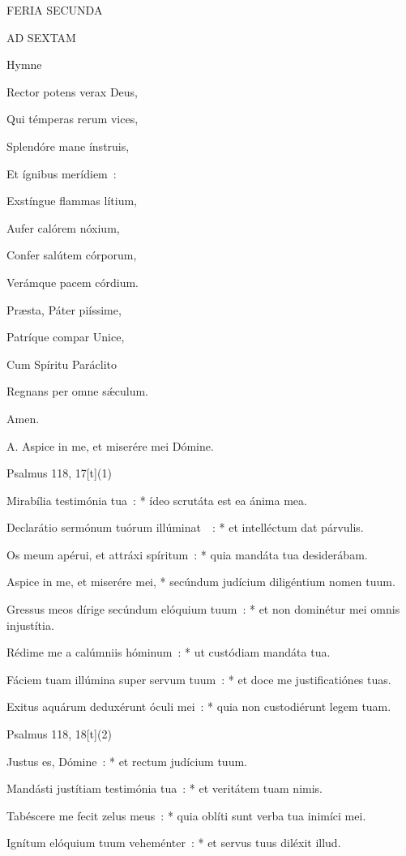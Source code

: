 FERIA SECUNDA

AD SEXTAM



Hymne

Rector potens verax Deus,

Qui témperas rerum vices,

Splendóre mane ínstruis,

Et ígnibus merídiem :



Exstíngue flammas lítium,

Aufer calórem nóxium,

Confer salútem córporum,

Verámque pacem córdium.



Præsta, Páter piíssime,

Patríque compar Unice,

Cum Spíritu Paráclito

Regnans per omne sǽculum.

Amen.


A. Aspice in me, et miserére mei Dómine.


Psalmus 118, 17[t](1)

Mirabília testimónia tua : * ídeo scrutáta est ea ánima mea.

Declarátio sermónum tuórum illúminat  : * et intelléctum dat párvulis.

Os meum apérui, et attráxi spíritum : * quia mandáta tua desiderábam.

Aspice in me, et miserére mei, * secúndum judícium diligéntium nomen tuum.

Gressus meos dírige secúndum elóquium tuum : * et non dominétur mei omnis injustítia.

Rédime me a calúmniis hóminum : * ut custódiam mandáta tua.

Fáciem tuam illúmina super servum tuum : * et doce me justificatiónes tuas.

Exitus aquárum deduxérunt óculi mei : * quia non custodiérunt legem tuam.



Psalmus 118, 18[t](2)

Justus es, Dómine : * et rectum judícium tuum.

Mandásti justítiam testimónia tua : * et veritátem tuam nimis.

Tabéscere me fecit zelus meus : * quia oblíti sunt verba tua inimíci mei.

Ignítum elóquium tuum veheménter : * et servus tuus diléxit illud.

